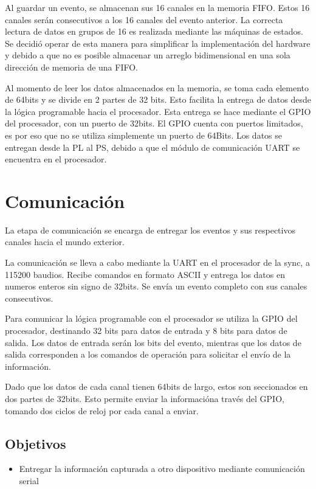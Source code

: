 Al guardar un evento, se almacenan sus 16 canales en la memoria FIFO. Estos 16 canales serán consecutivos a los 16 canales del evento anterior. La correcta lectura de datos en grupos de 16 es realizada mediante las máquinas de estados. Se decidió operar de esta manera para simplificar la implementación del hardware y debido a que no es posible almacenar un arreglo bidimensional en una sola dirección de memoria de una FIFO.

Al momento de leer los datos almacenados en la memoria, se toma cada elemento de 64bits y se divide en 2 partes de 32 bits. Esto facilita la entrega de datos desde la lógica programable hacia el procesador. Esta entrega se hace mediante el GPIO del procesador, con un puerto de 32bits. El GPIO cuenta con puertos limitados, es por eso que no se utiliza simplemente un puerto de 64Bits. Los datos se entregan desde la PL al PS, debido a que el módulo de comunicación UART se encuentra en el procesador.


\section{Comunicación}
\label{sec:comm}

La etapa de comunicación se encarga de entregar los eventos y sus respectivos canales hacia el mundo exterior.

La comunicación se lleva a cabo mediante la UART en el procesador de la sync, a 115200 baudios. Recibe comandos en formato ASCII y entrega los datos en numeros enteros sin signo de 32bits. Se envía un evento completo con sus canales consecutivos.

Para comunicar la lógica programable con el procesador se utiliza la GPIO del procesador, destinando 32 bits para datos de entrada y 8 bits para datos de salida. Los datos de entrada serán los bits del evento, mientras que los datos de salida corresponden a los comandos de operación para solicitar el envío de la información.

Dado que los datos de cada canal tienen 64bits de largo, estos son seccionados en dos partes de 32bits. Esto permite enviar la informacióna través del GPIO, tomando dos ciclos de reloj por cada canal a enviar.

\subsection{Objetivos}
\begin{itemize}
	\item Entregar la información capturada a otro dispositivo mediante comunicación serial 
\end{itemize}

